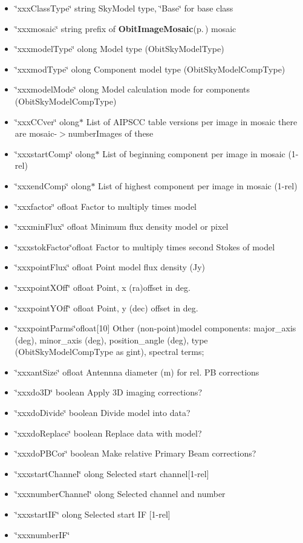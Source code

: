 \begin{Desc}
\begin{description}
\begin{itemize}
\item \char`\"{}xxx\-Class\-Type\char`\"{} string Sky\-Model type, \char`\"{}Base\char`\"{} for base class \item \char`\"{}xxxmosaic\char`\"{} string prefix of {\bf Obit\-Image\-Mosaic}{\rm (p.\,\pageref{structObitImageMosaic})} mosaic \item \char`\"{}xxxmodel\-Type\char`\"{} olong Model type (Obit\-Sky\-Model\-Type) \item \char`\"{}xxxmod\-Type\char`\"{} olong Component model type (Obit\-Sky\-Model\-Comp\-Type) \item \char`\"{}xxxmodel\-Mode\char`\"{} olong Model calculation mode for components (Obit\-Sky\-Model\-Comp\-Type) \item \char`\"{}xxx\-CCver\char`\"{} olong$\ast$ List of AIPSCC table versions per image in mosaic there are mosaic-$>$number\-Images of these \item \char`\"{}xxxstart\-Comp\char`\"{} olong$\ast$ List of beginning component per image in mosaic (1-rel) \item \char`\"{}xxxend\-Comp\char`\"{} olong$\ast$ List of highest component per image in mosaic (1-rel) \item \char`\"{}xxxfactor\char`\"{} ofloat Factor to multiply times model \item \char`\"{}xxxmin\-Flux\char`\"{} ofloat Minimum flux density model or pixel \item \char`\"{}xxxstok\-Factor\char`\"{}ofloat Factor to multiply times second Stokes of model \item \char`\"{}xxxpoint\-Flux\char`\"{} ofloat Point model flux density (Jy) \item \char`\"{}xxxpoint\-XOff\char`\"{} ofloat Point, x (ra)offset in deg. \item \char`\"{}xxxpoint\-YOff\char`\"{} ofloat Point, y (dec) offset in deg. \item \char`\"{}xxxpoint\-Parms\char`\"{}ofloat[10] Other (non-point)model components: major\_\-axis (deg), minor\_\-axis (deg), position\_\-angle (deg), type (Obit\-Sky\-Model\-Comp\-Type as gint), spectral terms; \item \char`\"{}xxxant\-Size\char`\"{} ofloat Antennna diameter (m) for rel. PB corrections \item \char`\"{}xxxdo3D\char`\"{} boolean Apply 3D imaging corrections? \item \char`\"{}xxxdo\-Divide\char`\"{} boolean Divide model into data? \item \char`\"{}xxxdo\-Replace\char`\"{} boolean Replace data with model? \item \char`\"{}xxxdo\-PBCor\char`\"{} boolean Make relative Primary Beam corrections? \item \char`\"{}xxxstart\-Channel\char`\"{} olong Selected start channel[1-rel] \item \char`\"{}xxxnumber\-Channel\char`\"{} olong Selected channel and number \item \char`\"{}xxxstart\-IF\char`\"{} olong Selected start IF [1-rel] \item \char`\"{}xxxnumber\-IF\char`\"{} 
\end{itemize}
\end{description}
\end{Desc}
